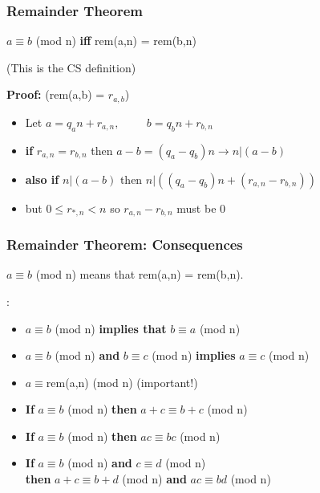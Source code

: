 \documentclass{beamer}
\begin{document}
\begin{frame}
  \frametitle{Remainder Theorem}

  {\larger

    $a \equiv b$ (mod n) {\bf iff} rem(a,n) = rem(b,n)

    \bigskip
    
    \hfill (This is the CS  definition)

    \bigskip

    {\bf Proof:} \hfill(rem(a,b) = $r_{a,b}$)
    \begin{itemize}
    \item Let $a = q_an + r_{a,n}, \hspace{1cm} b = q_bn + r_{b,n}$
    \item {\bf if} $r_{a,n} = r_{b,n}$ then $a-b = (q_a-q_b)n \rightarrow n|(a-b)$
    \item {\bf also if} $n|(a-b)$ then $n|((q_a-q_b)n+(r_{a,n}-r_{b,n}))$
    \item \hspace{2cm} but $0 \leq r_{*,n} < n$ so $r_{a,n}-r_{b,n}$ must be 0
    \end{itemize}    
  }
\end{frame}

\begin{frame}
  \frametitle{Remainder Theorem: Consequences}

  {\larger
    $a \equiv b$ (mod n) means that rem(a,n) = rem(b,n).

    \bigskip
    :

    \begin{itemize}
    \item $a \equiv b$ (mod n) {\bf implies that} $b \equiv a$ (mod n)
    \item $a \equiv b$ (mod n) {\bf and} $b \equiv c$ (mod n) {\bf implies}
      $a \equiv c$ (mod n)
    \item $a \equiv $rem(a,n) (mod n) \hfill (important!)
    \item {\bf If} $a \equiv b$ (mod n) {\bf then} $a+c \equiv b+c$ (mod n)
    \item {\bf If} $a \equiv b$ (mod n) {\bf then} $ac \equiv bc$ (mod n)
    \item {\bf If} $a \equiv b$ (mod n) {\bf and} $c\equiv d$ (mod n)\\
      {\bf then} $a+c \equiv b+d$ (mod n) {\bf and} $ac \equiv bd$ (mod n)
      
    \end{itemize}
  }
\end{frame}
\end{document}
